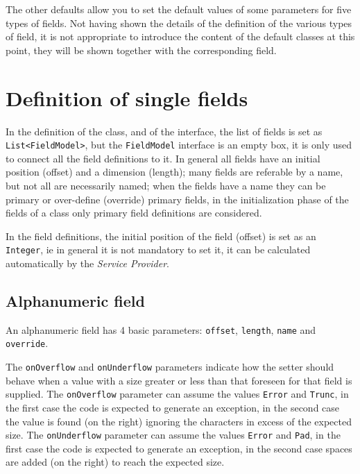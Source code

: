 The other defaults allow you to set the default values of some parameters for 
five types of fields. Not having shown the details of the definition of the 
various types of field, it is not appropriate to introduce the content of the 
default classes at this point, they will be shown together with the 
corresponding field.

\chapter{Definition of single fields}
In the definition of the class, and of the interface, the list of fields is set 
as \verb!List<FieldModel>!, but the \verb!FieldModel! interface is an empty box, 
it is only used to connect all the field definitions to it.
In general all fields have an initial position (offset) and a dimension 
(length); many fields are referable by a name, but not all are necessarily 
named; when the fields have a name they can be primary or over-define (override) 
primary fields, in the initialization phase of the fields of a class only 
primary field definitions are considered.

In the field definitions, the initial position of the field (offset) is set as 
an \texttt{Integer}, ie in general it is not mandatory to set it, it can be 
calculated automatically by the \textsl{Service Provider}.

\section{Alphanumeric field}
An alphanumeric field has 4 basic parameters: \verb!offset!, \verb!length!, 
\verb!name! and \verb!override!.

The \verb!onOverflow! and \verb!onUnderflow! parameters indicate how the setter 
should behave when a value with a size greater or less than that foreseen for 
that field is supplied. 
The \hypertarget{abc:ovf}{\texttt{onOverflow}} parameter can assume the values 
\verb!Error! and \verb!Trunc!, in the first case the code is expected to 
generate an exception, in the second case the value is found (on the right) 
ignoring the characters in excess of the expected size. 
The \hypertarget{abc:unf}{\texttt{onUnderflow}} parameter can assume the values 
\verb!Error! and \verb!Pad!, in the first case the code is expected to generate 
an exception, in the second case spaces are added (on the right) to reach the 
expected size.

